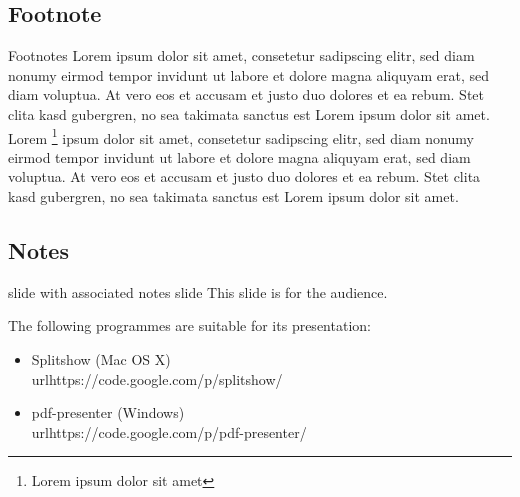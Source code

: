 \documentclass[xcolor={svgnames},12pt,aspectratio=169,handout]{beamer}
\begin{document}
\subsection{Footnote}

\begin{frame}{Footnotes}
    Lorem ipsum dolor sit amet, consetetur sadipscing elitr, sed diam nonumy eirmod tempor invidunt ut labore et dolore magna aliquyam erat, sed diam voluptua. At vero eos et accusam et justo duo dolores et ea rebum. Stet clita kasd gubergren, no sea takimata sanctus est Lorem ipsum dolor sit amet. Lorem \footnote{Lorem ipsum dolor sit amet} ipsum dolor sit amet, consetetur sadipscing elitr, sed diam nonumy eirmod tempor invidunt ut labore et dolore magna aliquyam erat, sed diam voluptua. At vero eos et accusam et justo duo dolores et ea rebum. Stet clita kasd gubergren, no sea takimata sanctus est Lorem ipsum dolor sit amet.
\end{frame}

\subsection{Notes}
\begin{frame}{slide with associated notes slide}
    This slide is for the audience.

    The following programmes are suitable for its presentation:

    \begin{itemize}
        \item Splitshow (Mac OS X)\\url{https://code.google.com/p/splitshow/}
        \item pdf-presenter (Windows)\\url{https://code.google.com/p/pdf-presenter/}
    \end{itemize}
\end{frame}

\end{document}
